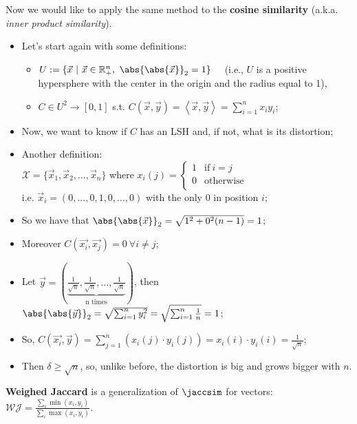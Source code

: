 \ex Now we would like to apply the same method to the \textbf{cosine similarity} (a.k.a. \textit{inner product similarity}).
\begin{itemize}
	\item Let's start again with some definitions:
	\begin{itemize}
		\item $U := \{ \vec{x} \ | \ \vec{x} \in \mathbb{R}_+^n, \ \abs{\abs{\vec{x}}}_2=1 \}$ \ \
		(i.e., $U$ is a positive hypersphere with the center in the origin and the radius equal to 1),
		\item $C \in U^2 \to [0,1]$ s.t. $C(\vec{x}, \vec{y}) = \left\langle \vec{x}, \vec{y} \right\rangle = \sum_{i=1}^n x_iy_i$;
	\end{itemize}
	\item Now, we want to know if $C$ has an LSH and, if not, what is its distortion;
	\item Another definition: \\
		$\mathcal{X}=\{ \vec{x}_1, \vec{x}_2, ..., \vec{x}_n \}$
		where $x_i(j)=\begin{cases}
			1 & \text{if}\ i=j\\
			0 & \text{otherwise}\\
		\end{cases} $ \\
		i.e. $\vec{x}_i=(0,...,0,1,0,...,0)$ with the only 0 in position $i$;
	\item So we have that $\abs{\abs{\vec{x}}}_2=\sqrt{1^2+0^2(n-1)}=1$;
	\item Moreover $C(\vec{x_i}, \vec{x_j})=0 \ \forall i\neq j$;
	\item Let $\vec{y}=\left( \underbrace{\frac{1}{\sqrt{n}}, \frac{1}{\sqrt{n}}, ..., \frac{1}{\sqrt{n}}}_\text{n times} \right)$, then $\abs{\abs{\vec{y}}}_2 = \sqrt{\sum_{i=1}^n y_i^2} = \sqrt{\sum_{i=1}^n \frac{1}{n}}=1$;
	\item So, $C(\vec{x_i}, \vec{y})= \sum_{j=1}^n \left( x_i(j) \cdot y_i(j) \right) = x_i(i) \cdot y_i(i) = \frac{1}{\sqrt{n}}$;
	\item Then $\delta \geq \sqrt{n}$, so, unlike before, the distortion is big and grows bigger with $n$.
\end{itemize}

\ex \textbf{Weighed Jaccard} is a generalization of $\jaccsim$ for vectors: \\ $\mathcal{WJ}=\frac
	{\sum_i \min(x_i, y_i)}{\sum_i \max(x_i, y_i)}$.

